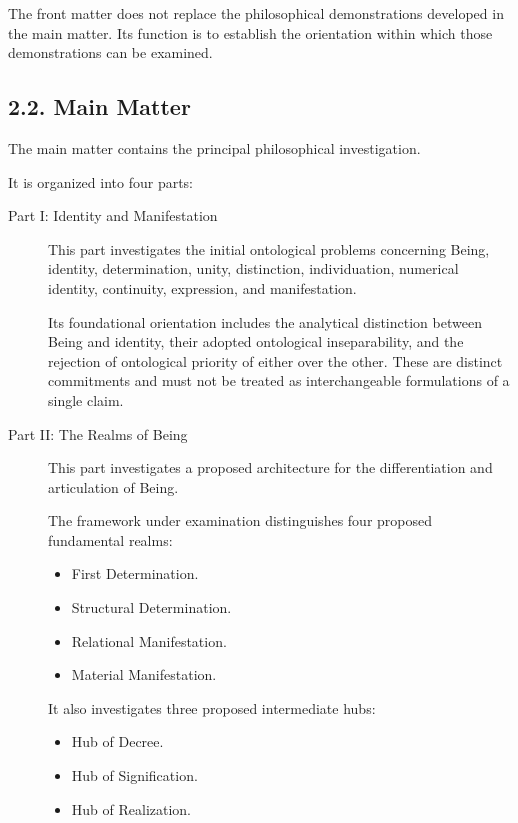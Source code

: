 The front matter does not replace the philosophical
demonstrations developed in the main matter.
Its function is to establish the orientation
within which those demonstrations can be examined.

\subsection*{2.2. Main Matter}

The main matter contains the principal philosophical
investigation.

It is organized into four parts:

\begin{description}

    \item[Part I: Identity and Manifestation]
    This part investigates the initial ontological
    problems concerning Being, identity, determination,
    unity, distinction, individuation, numerical identity,
    continuity, expression, and manifestation.

    Its foundational orientation includes the
    analytical distinction between Being and identity,
    their adopted ontological inseparability, and
    the rejection of ontological priority of either
    over the other. These are distinct commitments
    and must not be treated as interchangeable
    formulations of a single claim.

    \item[Part II: The Realms of Being]
    This part investigates a proposed architecture
    for the differentiation and articulation of Being.

    The framework under examination distinguishes
    four proposed fundamental realms:

    \begin{itemize}
        \item First Determination.
        \item Structural Determination.
        \item Relational Manifestation.
        \item Material Manifestation.
    \end{itemize}

    It also investigates three proposed intermediate
    hubs:

    \begin{itemize}
        \item Hub of Decree.
        \item Hub of Signification.
        \item Hub of Realization.
    \end{itemize}


\end{description}
